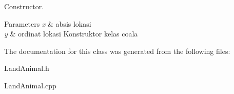 Constructor. 


\begin{DoxyParams}{Parameters}
{\em x} & absis lokasi \\
\hline
{\em y} & ordinat lokasi Konstruktor kelas coala \\
\hline
\end{DoxyParams}


The documentation for this class was generated from the following files\+:\begin{DoxyCompactItemize}
\item 
Land\+Animal.\+h\item 
Land\+Animal.\+cpp\end{DoxyCompactItemize}

